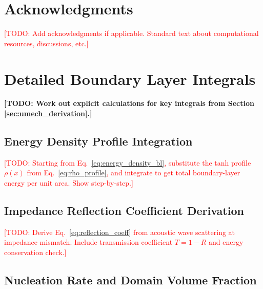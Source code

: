 \documentclass[11pt,a4paper]{article}
\theoremstyle{definition}
\theoremstyle{remark}
\begin{document}
\section*{Acknowledgments}

\textcolor{red}{[TODO: Add acknowledgments if applicable. Standard text about computational resources, discussions, etc.]}


\appendix

\section{Detailed Boundary Layer Integrals}
\label{app:bl_integrals}

\textbf{[TODO: Work out explicit calculations for key integrals from Section \ref{sec:umech_derivation}.]}

\subsection{Energy Density Profile Integration}
\label{app:energy_integration}

\textcolor{red}{[TODO: Starting from Eq.~\ref{eq:energy_density_bl}, substitute the tanh profile $\rho(x)$ from Eq.~\ref{eq:rho_profile}, and integrate to get total boundary-layer energy per unit area. Show step-by-step.]}

\subsection{Impedance Reflection Coefficient Derivation}
\label{app:impedance_derivation}

\textcolor{red}{[TODO: Derive Eq.~\ref{eq:reflection_coeff} from acoustic wave scattering at impedance mismatch. Include transmission coefficient $T = 1 - R$ and energy conservation check.]}

\subsection{Nucleation Rate and Domain Volume Fraction}
\label{app:nucleation}
\end{document}
